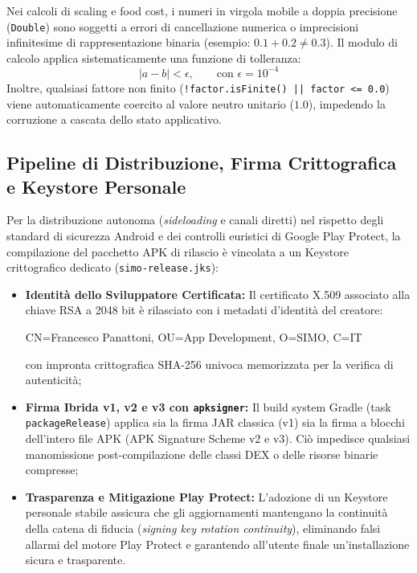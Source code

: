 \documentclass[11pt,a4paper,titlepage]{article}
\begin{document}
Nei calcoli di scaling e food cost, i numeri in virgola mobile a doppia precisione (\texttt{Double}) sono soggetti a errori di cancellazione numerica o imprecisioni infinitesime di rappresentazione binaria (esempio: $0.1 + 0.2 \neq 0.3$).
Il modulo di calcolo applica sistematicamente una funzione di tolleranza:
$$|a - b| < \epsilon, \qquad \text{con } \epsilon = 10^{-4}$$
Inoltre, qualsiasi fattore non finito (\texttt{!factor.isFinite() || factor <= 0.0}) viene automaticamente coercito al valore neutro unitario ($1.0$), impedendo la corruzione a cascata dello stato applicativo.

\subsection{Pipeline di Distribuzione, Firma Crittografica e Keystore Personale}
Per la distribuzione autonoma (\textit{sideloading} e canali diretti) nel rispetto degli standard di sicurezza Android e dei controlli euristici di Google Play Protect, la compilazione del pacchetto APK di rilascio \`e vincolata a un Keystore crittografico dedicato (\texttt{simo-release.jks}):
\begin{itemize}[leftmargin=*]
    \item \textbf{Identit\`a dello Sviluppatore Certificata:} Il certificato X.509 associato alla chiave RSA a 2048 bit \`e rilasciato con i metadati d'identit\`a del creatore:
    \begin{center}
    \small\ttfamily
    CN=Francesco Panattoni, OU=App Development, O=SIMO, C=IT
    \end{center}
    con impronta crittografica SHA-256 univoca memorizzata per la verifica di autenticit\`a;
    \item \textbf{Firma Ibrida v1, v2 e v3 con \texttt{apksigner}:} Il build system Gradle (task \texttt{packageRelease}) applica sia la firma JAR classica (v1) sia la firma a blocchi dell'intero file APK (APK Signature Scheme v2 e v3). Ci\`o impedisce qualsiasi manomissione post-compilazione delle classi DEX o delle risorse binarie compresse;
    \item \textbf{Trasparenza e Mitigazione Play Protect:} L'adozione di un Keystore personale stabile assicura che gli aggiornamenti mantengano la continuit\`a della catena di fiducia (\textit{signing key rotation continuity}), eliminando falsi allarmi del motore Play Protect e garantendo all'utente finale un'installazione sicura e trasparente.
\end{itemize}
\end{document}
